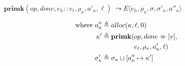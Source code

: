 \documentclass[12pt,draft]{article}
\newcommand\mdoubleplus{\ensuremath{\mathbin{+\mkern-9mu+}}}
\begin{document}
\begin{multicols*}{2}
\begin{center}
  $\textbf{primk}(op, done, e_h::e_t, \rho_\kappa, a'_\kappa, \ell)$
  $\leadsto E\langle e_h , \rho_\kappa ,\sigma ,\sigma'_\kappa,a''_\kappa \rangle$
\end{center}
\vspace{-7mm}
\begin{align*}
  \text{where }
  a''_\kappa &\triangleq alloc(\kappa, \ell, 0) \\
  \kappa' &\triangleq \textbf{primk}(op, done \mdoubleplus [v],\\
             &\;\;\;\;\;\;\;\;\;\;\;\;\;\;\;\;\;e_t, \rho_\kappa, a'_\kappa, \ell) \\
  \sigma'_\kappa &\triangleq \sigma_\kappa \sqcup [a''_\kappa \mapsto \kappa']
\end{align*}
\end{multicols*}
\newpage

\end{document}
